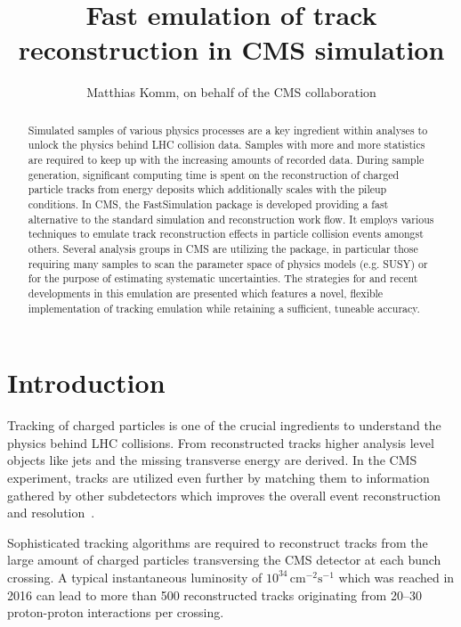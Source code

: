\documentclass[a4paper]{jpconf}
\begin{document}
\title{Fast emulation of track reconstruction in CMS simulation}

\author{Matthias Komm, on behalf of the CMS collaboration}

\address{Centre for Cosmology, Particle Physics and Phenomenology,
Universit\'e catholique de Louvain, Louvain-la-Neuve, BELGIUM}


\begin{abstract}
Simulated samples of various physics processes are a key ingredient within analyses to unlock the physics behind LHC collision data. Samples with more and more statistics are required to keep up with the increasing amounts of recorded data. During sample generation, significant computing time is spent on the reconstruction of charged particle tracks from energy deposits which additionally scales with the pileup conditions. In CMS, the FastSimulation package is developed providing a fast alternative to the standard simulation and reconstruction work flow. It employs various techniques to emulate track reconstruction effects in particle collision events amongst others. Several analysis groups in CMS are utilizing the package, in particular those requiring many samples to scan the parameter space of physics models (e.g. SUSY) or for the purpose of estimating systematic uncertainties. The strategies for and recent developments in this emulation are presented which features a novel, flexible implementation of tracking emulation while retaining a sufficient, tuneable accuracy.
\end{abstract}


\section{Introduction}
Tracking of charged particles is one of the crucial ingredients to understand the physics behind LHC collisions. From reconstructed tracks higher analysis level objects like jets and the missing transverse energy are derived. In the CMS experiment, tracks are utilized even further by matching them to information gathered by other subdetectors which improves the overall event reconstruction and resolution~\cite{pf}.

Sophisticated tracking algorithms are required to reconstruct tracks from the large amount of charged particles transversing the CMS detector at each bunch crossing. A typical instantaneous luminosity of $10^{34}\,\mathrm{cm}^{-2}\mathrm{s}^{-1}$ which was reached in 2016 can lead to more than 500 reconstructed tracks originating from 20--30 proton-proton interactions per crossing.
\end{document}

